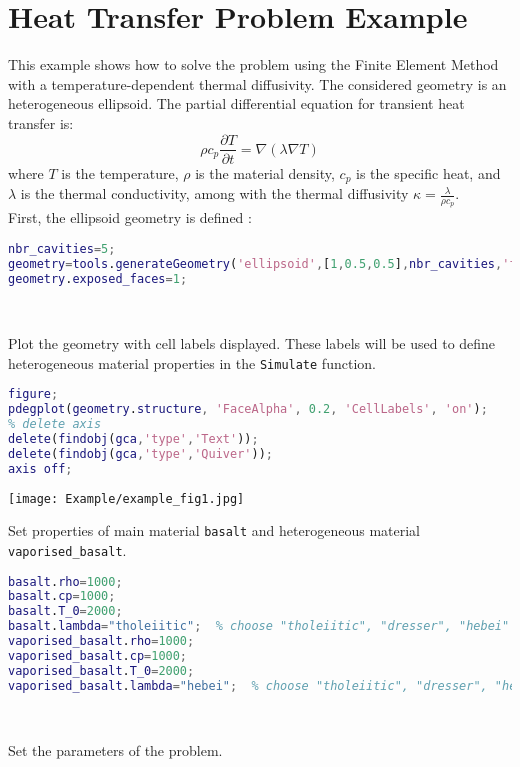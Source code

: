 \section{Heat Transfer Problem Example}

This example shows how to solve the problem using the Finite Element Method with a temperature-dependent thermal diffusivity. The considered geometry is an heterogeneous ellipsoid. The partial differential equation for transient heat transfer is:
$$ \rho c_p \dfrac{\partial T}{\partial t} = \nabla (\lambda \nabla T) $$
where $T$ is the temperature, $\rho$ is the material density, $c_p$ is the specific heat, and $\lambda$ is the thermal conductivity, among with the thermal diffusivity $\kappa = \frac{\lambda}{\rho c_p}$.\\

First, the ellipsoid geometry is defined : 

\begin{lstlisting}[language=Matlab]
nbr_cavities=5; 
geometry=tools.generateGeometry('ellipsoid',[1,0.5,0.5],nbr_cavities,'full',0.1,0.3);
geometry.exposed_faces=1;
\end{lstlisting}
\ 

Plot the geometry with cell labels displayed. These labels will be used to define heterogeneous material properties in the {\tt Simulate} function.

\begin{lstlisting}[language=Matlab]
figure;
pdegplot(geometry.structure, 'FaceAlpha', 0.2, 'CellLabels', 'on');
% delete axis
delete(findobj(gca,'type','Text')); 
delete(findobj(gca,'type','Quiver')); 
axis off; 
\end{lstlisting}

\begin{center}
\texttt{[image: Example/example\_fig1.jpg]}
\end{center}

Set properties of main material {\tt basalt} and heterogeneous material {\tt vaporised\_basalt}. 

\begin{lstlisting}[language=Matlab]
basalt.rho=1000;
basalt.cp=1000;
basalt.T_0=2000; 
basalt.lambda="tholeiitic";  % choose "tholeiitic", "dresser", "hebei"
vaporised_basalt.rho=1000;
vaporised_basalt.cp=1000;
vaporised_basalt.T_0=2000;
vaporised_basalt.lambda="hebei";  % choose "tholeiitic", "dresser", "hebei"
\end{lstlisting}
\

Set the parameters of the problem. 

